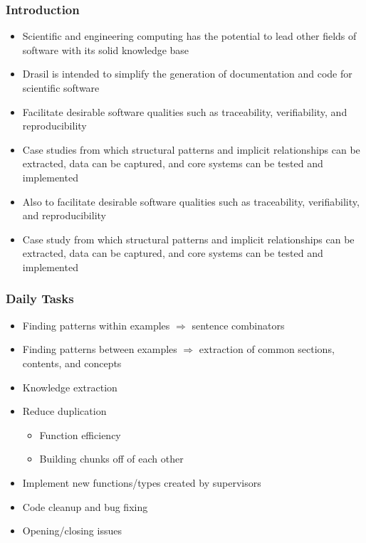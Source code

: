 \documentclass{beamer}
\begin{document}
\begin{frame}
\frametitle{Introduction}
\begin{itemize}
 \item<1-> Scientific and engineering computing has the potential to lead other fields of software with its solid knowledge base
 \item<2-> Drasil is intended to simplify the generation of documentation and code for scientific software
 \item<3-> Facilitate desirable software qualities such as traceability, verifiability, and reproducibility
 \item<4-> Case studies from which structural patterns and implicit relationships can be extracted, data can be captured, and core systems can be tested and implemented
 \item<3-> Also to facilitate desirable software qualities such as traceability, verifiability, and reproducibility
 \item<4-> Case study from which structural patterns and implicit relationships can be extracted, data can be captured, and core systems can be tested and implemented
\end{itemize}
\end{frame}

\begin{frame}
\frametitle{Daily Tasks}
\begin{itemize}
 \item<1-> Finding patterns within examples $\Rightarrow$ sentence combinators
 \item<2-> Finding patterns between examples $\Rightarrow$ extraction of common sections, contents, and concepts
 \item<3-> Knowledge extraction
 \item<4-> Reduce duplication
   \begin{itemize}
     \item Function efficiency
     \item Building chunks off of each other
   \end{itemize}
 \item<5-> Implement new functions/types created by supervisors
 \item<6-> Code cleanup and bug fixing
 \item<7-> Opening/closing issues
\end{itemize}
\end{frame}
\end{document}

